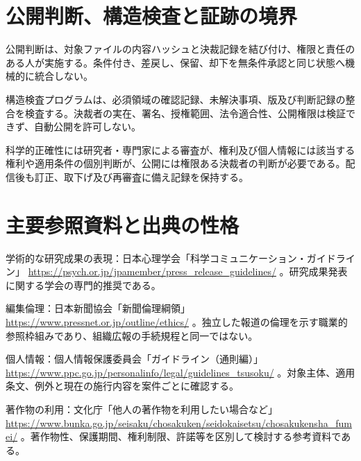 \documentclass[a4paper,11pt]{article}
\begin{document}
\section{公開判断、構造検査と証跡の境界}
\par 公開判断は、対象ファイルの内容ハッシュと決裁記録を結び付け、権限と責任のある人が実施する。条件付き、差戻し、保留、却下を無条件承認と同じ状態へ機械的に統合しない。\par\medskip
\par 構造検査プログラムは、必須領域の確認記録、未解決事項、版及び判断記録の整合を検査する。決裁者の実在、署名、授権範囲、法令適合性、公開権限は検証できず、自動公開を許可しない。\par\medskip
\par 科学的正確性には研究者・専門家による審査が、権利及び個人情報には該当する権利や適用条件の個別判断が、公開には権限ある決裁者の判断が必要である。配信後も訂正、取下げ及び再審査に備え記録を保持する。\par\medskip
\section{主要参照資料と出典の性格}
\par 学術的な研究成果の表現：日本心理学会「科学コミュニケーション・ガイドライン」 \url{https://psych.or.jp/jpamember/press_release_guidelines/} 。研究成果発表に関する学会の専門的推奨である。\par\medskip
\par 編集倫理：日本新聞協会「新聞倫理綱領」 \url{https://www.pressnet.or.jp/outline/ethics/} 。独立した報道の倫理を示す職業的参照枠組みであり、組織広報の手続規程と同一ではない。\par\medskip
\par 個人情報：個人情報保護委員会「ガイドライン（通則編）」 \url{https://www.ppc.go.jp/personalinfo/legal/guidelines_tsusoku/} 。対象主体、適用条文、例外と現在の施行内容を案件ごとに確認する。\par\medskip
\par 著作物の利用：文化庁「他人の著作物を利用したい場合など」 \url{https://www.bunka.go.jp/seisaku/chosakuken/seidokaisetsu/chosakukensha_fumei/} 。著作物性、保護期間、権利制限、許諾等を区別して検討する参考資料である。\par\medskip
\end{document}
